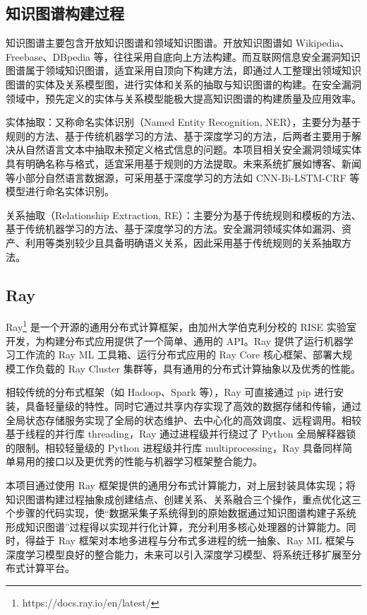 \documentclass[a4paper,AutoFakeBold,oneside,12pt]{book}
\begin{document}
\subsection{知识图谱构建过程}

知识图谱主要包含开放知识图谱和领域知识图谱。开放知识图谱如 Wikipedia、Freebase、DBpedia 等，往往采用自底向上方法构建。而互联网信息安全漏洞知识图谱属于领域知识图谱，适宜采用自顶向下构建方法，即通过人工整理出领域知识图谱的实体及关系模型图，进行实体和关系的抽取与知识图谱的构建。在安全漏洞领域中，预先定义的实体与关系模型能极大提高知识图谱的构建质量及应用效率。\cite{zhang_survey_2021}

实体抽取：又称命名实体识别（Named Entity Recognition, NER），主要分为基于规则的方法、基于传统机器学习的方法、基于深度学习的方法\cite{zhou_survey_2020}，后两者主要用于解决从自然语言文本中抽取未预定义格式信息的问题。本项目相关安全漏洞领域实体具有明确名称与格式，适宜采用基于规则的方法提取。未来系统扩展如博客、新闻等小部分自然语言数据源，可采用基于深度学习的方法如 CNN-Bi-LSTM-CRF 等模型进行命名实体识别。

关系抽取（Relationship Extraction, RE）：主要分为基于传统规则和模板的方法、基于传统机器学习的方法、基于深度学习的方法\cite{zhou_survey_2020}。安全漏洞领域实体如漏洞、资产、利用等类别较少且具备明确语义关系，因此采用基于传统规则的关系抽取方法。

\subsection{Ray}

Ray\footnote{https://docs.ray.io/en/latest/} 是一个开源的通用分布式计算框架，由加州大学伯克利分校的 RISE 实验室开发，为构建分布式应用提供了一个简单、通用的 API。Ray 提供了运行机器学习工作流的 Ray ML 工具箱、运行分布式应用的 Ray Core 核心框架、部署大规模工作负载的 Ray Cluster 集群等，具有通用的分布式计算抽象以及优秀的性能。

相较传统的分布式框架（如 Hadoop、Spark 等），Ray 可直接通过 pip 进行安装，具备轻量级的特性。同时它通过共享内存实现了高效的数据存储和传输，通过全局状态存储服务实现了全局的状态维护、去中心化的高效调度、远程调用。相较基于线程的并行库  threading，Ray 通过进程级并行绕过了 Python 全局解释器锁的限制。相较轻量级的 Python 进程级并行库 multiprocessing，Ray 具备同样简单易用的接口以及更优秀的性能与机器学习框架整合能力。

本项目通过使用 Ray 框架提供的通用分布式计算能力，对上层封装具体实现；将知识图谱构建过程抽象成创建结点、创建关系、关系融合三个操作，重点优化这三个步骤的代码实现，使“数据采集子系统得到的原始数据通过知识图谱构建子系统形成知识图谱”过程得以实现并行化计算，充分利用多核心处理器的计算能力。同时，得益于 Ray 框架对本地多进程与分布式多进程的统一抽象、Ray ML 框架与深度学习模型良好的整合能力，未来可以引入深度学习模型、将系统迁移扩展至分布式计算平台。
\end{document}
